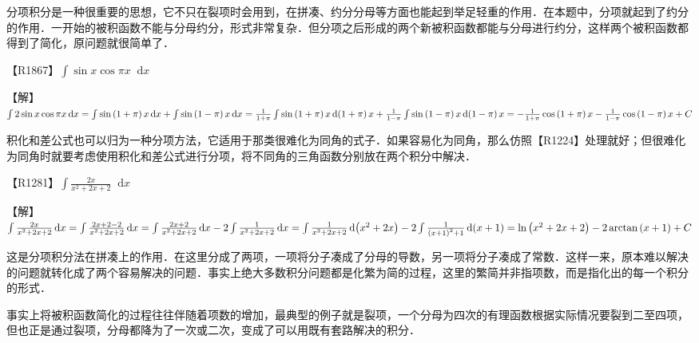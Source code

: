 \documentclass{ctexbook}
\newcommand*{\dif}{\mathop{}\!\mathrm{d}}
\begin{document}
{\kaishu 分项积分是一种很重要的思想，它不只在裂项时会用到，在拼凑、约分分母等方面也能起到举足轻重的作用．在本题中，分项就起到了约分的作用．一开始的被积函数不能与分母约分，形式非常复杂．但分项之后形成的两个新被积函数都能与分母进行约分，这样两个被积函数都得到了简化，原问题就很简单了．}\par
【R1867】$\int\sin{x}\cos{\pi x}\dif{x}$\par
【解】$\int2\sin{x}\cos{\pi x}\dif{x}\\=\int\sin{\left(1+\pi\right)x}\dif{x}+\int\sin{\left(1-\pi\right)x}\dif{x}\\=\frac{1}{1+\pi}\int\sin{\left(1+\pi\right)x}\dif{\left(1+\pi\right)x}+\frac{1}{1-\pi}\int\sin{\left(1-\pi\right)x}\dif{\left(1-\pi\right)x}\\=-\frac{1}{1+\pi}\cos{\left(1+\pi\right)x}-\frac{1}{1-\pi}\cos{\left(1-\pi\right)x}+C$\par
{\kaishu 积化和差公式也可以归为一种分项方法，它适用于那类很难化为同角的式子．如果容易化为同角，那么仿照【R1224】处理就好；但很难化为同角时就要考虑使用积化和差公式进行分项，将不同角的三角函数分别放在两个积分中解决．}\par
【R1281】$\int\frac{2x}{x^{2}+2x+2}\dif{x}$\par
【解】$\int\frac{2x}{x^{2}+2x+2}\dif{x}\\=\int\frac{2x+2-2}{x^{2}+2x+2}\dif{x}\\=\int\frac{2x+2}{x^{2}+2x+2}\dif{x}-2\int\frac{1}{x^{2}+2x+2}\dif{x}\\=\int\frac{1}{x^{2}+2x+2}\dif{\left(x^{2}+2x\right)}-2\int\frac{1}{\left(x+1\right)^{2}+1}\dif{\left(x+1\right)}\\=\ln{\left(x^{2}+2x+2\right)}-2\arctan{\left(x+1\right)}+C$\par
{\kaishu 这是分项积分法在拼凑上的作用．在这里分成了两项，一项将分子凑成了分母的导数，另一项将分子凑成了常数．这样一来，原本难以解决的问题就转化成了两个容易解决的问题．事实上绝大多数积分问题都是化繁为简的过程，这里的繁简并非指项数，而是指化出的每一个积分的形式．\par
事实上将被积函数简化的过程往往伴随着项数的增加，最典型的例子就是裂项，一个分母为四次的有理函数根据实际情况要裂到二至四项，但也正是通过裂项，分母都降为了一次或二次，变成了可以用既有套路解决的积分．}\par
\end{document}
